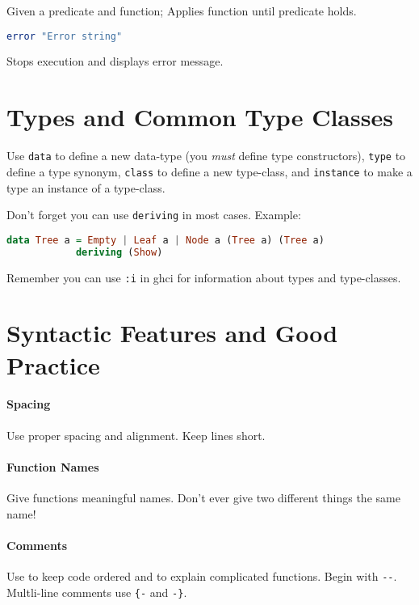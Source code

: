 \documentclass[twocolumn,english]{article}
\begin{document}
Given a predicate and function; Applies function until predicate holds.

\begin{lstlisting}[language=Haskell,frame=single]
error "Error string"
\end{lstlisting}


Stops execution and displays error message.


\section{Types and Common Type Classes}

Use \texttt{data} to define a new data-type (you \emph{must} define
type constructors), \texttt{type} to define a type synonym, \texttt{class}
to define a new type-class, and \texttt{instance} to make a type an
instance of a type-class.

Don't forget you can use \texttt{deriving} in most cases. Example:

\begin{lstlisting}[language=Haskell,frame=single]
data Tree a = Empty | Leaf a | Node a (Tree a) (Tree a) 
            deriving (Show) 
\end{lstlisting}
Remember you can use \texttt{:i} in ghci for information about types
and type-classes.


\section{Syntactic Features and Good Practice}


\paragraph{Spacing}

Use proper spacing and alignment. Keep lines short.


\paragraph{Function Names}

Give functions meaningful names. Don't ever give two different things
the same name!


\paragraph{Comments}

Use to keep code ordered and to explain complicated functions. Begin
with \texttt{-{}-}. Multli-line comments use \texttt{\{-} and \texttt{-\}}.
\end{document}
